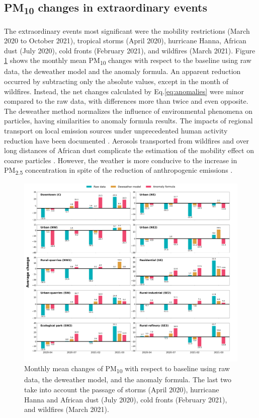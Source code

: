\documentclass[preprint,12pt]{elsarticle}
\begin{document}
\subsection{PM\textsubscript{10} changes in extraordinary events}
The extraordinary events most significant were the mobility restrictions (March 2020 to October 2021), tropical storms (April 2020), hurricane Hanna, African dust (July 2020), cold fronts (February 2021), and wildfires (March 2021). Figure \ref{fig:average_change_deweather_fourier} shows the monthly mean PM\textsubscript{10} changes with respect to the baseline using raw data, the deweather model and the anomaly formula. An apparent reduction occurred by subtracting only the absolute values, except in the month of wildfires. Instead, the net changes calculated by Eq.\ref{eq:anomalies} were minor compared to the raw data, with differences more than twice and even opposite. The deweather method normalizes the influence of environmental phenomena on particles, having similarities to anomaly formula results. The impacts of regional transport on local emission sources under unprecedented human activity reduction have been documented \citep{Shen_2021}. Aerosols transported from wildfires and over long distances of African dust complicate the estimation of the mobility effect on coarse particles \citep{Conte_2023}. However, the weather is more conducive to the increase in PM\textsubscript{2.5} concentration in spite of the reduction of anthropogenic emissions \citep{Liu_2022}.
\begin{figure}[ht!]
	\centering
	\includegraphics[width=\linewidth]{figures/average_change_deweather_fourier.png}
	\caption{Monthly mean changes of PM\textsubscript{10} with respect to baseline using raw data, the deweather model, and the anomaly formula. The last two take into account the passage of storms (April 2020), hurricane Hanna and African dust (July 2020), cold fronts (February 2021), and wildfires (March 2021).
	}
	\label{fig:average_change_deweather_fourier}
\end{figure}
\end{document}
